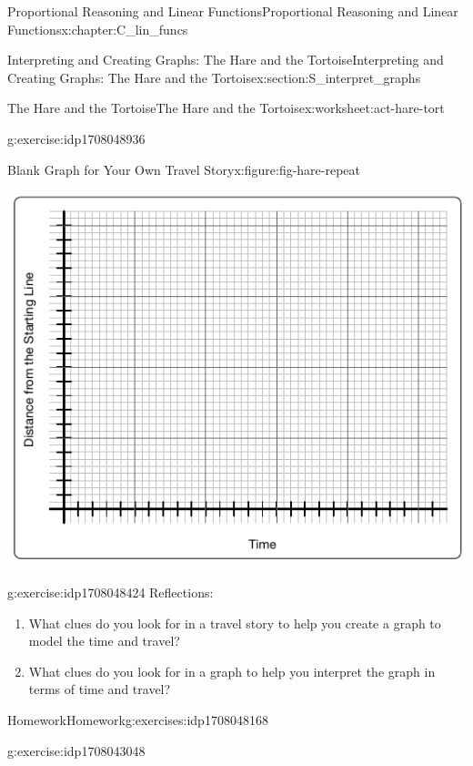 \documentclass[oneside,10pt,]{book}
\numberwithin{equation}{chapter}
\begin{document}
\begin{chapterptx}{Proportional Reasoning and Linear Functions}{}{Proportional Reasoning and Linear Functions}{}{}{x:chapter:C_lin_funcs}
\begin{sectionptx}{Interpreting and Creating Graphs: The Hare and the Tortoise}{}{Interpreting and Creating Graphs: The Hare and the Tortoise}{}{}{x:section:S_interpret_graphs}
\begin{worksheet-subsection}{The Hare and the Tortoise}{}{The Hare and the Tortoise}{}{}{x:worksheet:act-hare-tort}
\begin{divisionexercise}{3}{}{}{g:exercise:idp1708048936}
\begin{figureptx}{Blank Graph for Your Own Travel Story}{x:figure:fig-hare-repeat}{}
\begin{image}{0.15}{0.7}{0.15}
\includegraphics[width=\linewidth]{external/hare-grid.pdf}
\end{image}%
\tcblower
\end{figureptx}%
\end{divisionexercise}%
\begin{divisionexercise}{4}{}{}{g:exercise:idp1708048424}%
Reflections:%
\begin{enumerate}[font=\bfseries,label=(\alph*),ref=\alph*]
\item{}What clues do you look for in a travel story to help you create a graph to model the time and travel?%
\item{}What clues do you look for in a graph to help you interpret the graph in terms of time and travel?%
\end{enumerate}
\end{divisionexercise}%
\end{worksheet-subsection}
\restoregeometry
%
%
\typeout{************************************************}
\typeout{************************************************}
%
\begin{exercises-subsection}{Homework}{}{Homework}{}{}{g:exercises:idp1708048168}
\begin{divisionexercise}{1}{}{}{g:exercise:idp1708043048}%

\end{divisionexercise}
\end{exercises-subsection}
\end{sectionptx}
\end{chapterptx}
\end{document}
